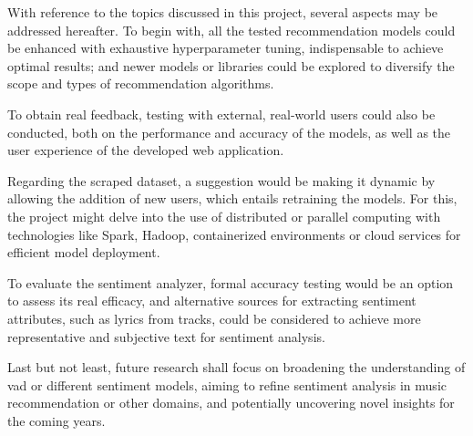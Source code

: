 With reference to the topics discussed in this project, several aspects may be addressed hereafter. To begin with, all the tested recommendation models could be enhanced with exhaustive hyperparameter tuning, indispensable to achieve optimal results; and newer models or libraries could be explored to diversify the scope and types of recommendation algorithms.

To obtain real feedback, testing with external, real-world users could also be conducted, both on the performance and accuracy of the models, as well as the user experience of the developed web application.

Regarding the scraped dataset, a suggestion would be making it dynamic by allowing the addition of new users, which entails retraining the models. For this, the project might delve into the use of distributed or parallel computing with technologies like Spark, Hadoop, containerized environments or cloud services for efficient model deployment.

To evaluate the sentiment analyzer, formal accuracy testing would be an option to assess its real efficacy, and alternative sources for extracting sentiment attributes, such as lyrics from tracks, could be considered to achieve more representative and subjective text for sentiment analysis.

Last but not least, future research shall focus on broadening the understanding of \acs{vad} or different sentiment models, aiming to refine sentiment analysis in music recommendation or other domains, and potentially uncovering novel insights for the coming years.